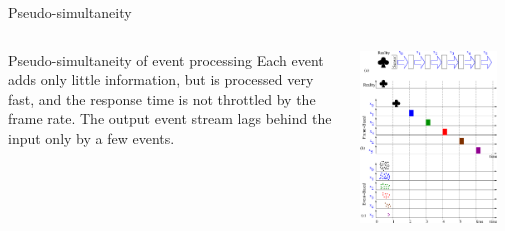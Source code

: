 \documentclass[11pt,center]{beamer}
\begin{document}
	\begin{frame}{Pseudo-simultaneity}
		\begin{columns}
			\begin{block}{Pseudo-simultaneity of event processing}
				Each event adds only little information, but is processed very fast,
				and the response time is not throttled by the frame rate.
				The output event stream lags behind the input only by a few events.
			\end{block}

			\includegraphics[width=0.9\textwidth]{../pics/pseudo-simultaneous_processing.png}
		\end{columns}
	\end{frame}
\end{document}
